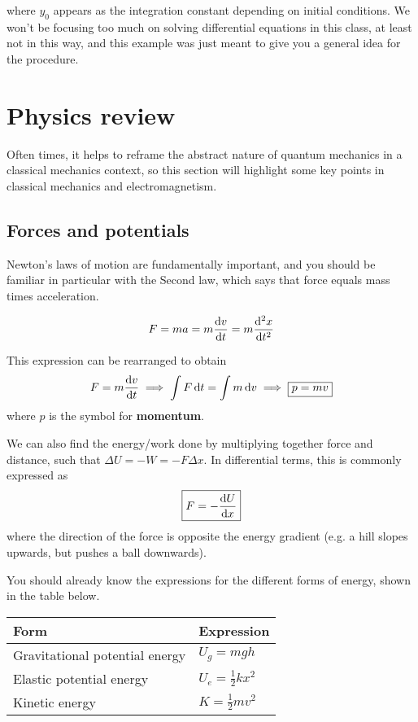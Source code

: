 where $y_0$ appears as the integration constant depending on initial conditions. We won't be focusing too much on solving differential equations in this class, at least not in this way, and this example was just meant to give you a general idea for the procedure.


\section{Physics review}
Often times, it helps to reframe the abstract nature of quantum mechanics in a classical mechanics context, so this section will highlight some key points in classical mechanics and electromagnetism. \par 

\subsection{Forces and potentials}

Newton's laws of motion are fundamentally important, and you should be familiar in particular with the Second law, which says that force equals mass times acceleration.
\begin{tcolorbox}[title=Newton's Second law] \vspace{-2ex}
\[ F = ma = m \dv{v}{t} = m\dv[2]{x}{t} \]
\end{tcolorbox} 

This expression can be rearranged to obtain 
\begin{equation*}
	F = m\dv{v}{t} \implies \int F\dd{t} = \int m\dd{v} \implies \boxed{p = mv}
\end{equation*}
where $p$ is the symbol for \textbf{momentum}. \par 

We can also find the energy/work done by multiplying together force and distance, such that $\Delta U = -W = -F \Delta x$. In differential terms, this is commonly expressed as 
\begin{equation}
\boxed{F = -\dv{U}{x}} \label{eq:FdU}
\end{equation}
where the direction of the force is opposite the energy gradient (e.g. a hill slopes upwards, but pushes a ball downwards). \par 

You should already know the expressions for the different forms of energy, shown in the table below. \par 
\begin{table}[!h]
	\centering 
	\begin{tabular}{ll}
		\textbf{Form} & \textbf{Expression} \\ \toprule 
		Gravitational potential energy & $U_g = mgh$ \\ \rule{0ex}{3ex}
		Elastic potential energy & $U_e = \frac{1}{2}kx^2$ \\ \rule{0ex}{3ex}
		Kinetic energy & $K = \frac{1}{2}mv^2$
	\end{tabular}
\end{table} 

